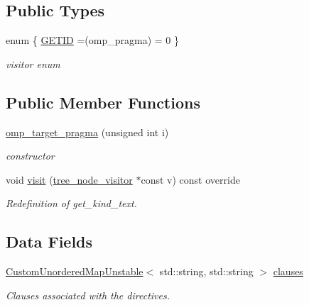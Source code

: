 \subsection*{Public Types}
\begin{DoxyCompactItemize}
\item 
enum \{ \hyperlink{structomp__target__pragma_a622abd9cbbfe6023aee7a4c1f380305da600b22a4d6e666417d4383b46ded575b}{G\+E\+T\+ID} =(omp\+\_\+pragma) = 0
 \}\begin{DoxyCompactList}\small\item\em visitor enum \end{DoxyCompactList}
\end{DoxyCompactItemize}
\subsection*{Public Member Functions}
\begin{DoxyCompactItemize}
\item 
\hyperlink{structomp__target__pragma_a55b5a159b5535e6c836ac8aaf78e8d09}{omp\+\_\+target\+\_\+pragma} (unsigned int i)
\begin{DoxyCompactList}\small\item\em constructor \end{DoxyCompactList}\item 
void \hyperlink{structomp__target__pragma_a6b68bf02eef68fa2c841b75afabf06b7}{visit} (\hyperlink{classtree__node__visitor}{tree\+\_\+node\+\_\+visitor} $\ast$const v) const override
\begin{DoxyCompactList}\small\item\em Redefinition of get\+\_\+kind\+\_\+text. \end{DoxyCompactList}\end{DoxyCompactItemize}
\subsection*{Data Fields}
\begin{DoxyCompactItemize}
\item 
\hyperlink{custom__map_8hpp_a8cbaceffc09790a885ec7e9c17809c69}{Custom\+Unordered\+Map\+Unstable}$<$ std\+::string, std\+::string $>$ \hyperlink{structomp__target__pragma_ab4dde9a57e575ebebd813465695be1c1}{clauses}
\begin{DoxyCompactList}\small\item\em Clauses associated with the directives. \end{DoxyCompactList}\end{DoxyCompactItemize}
